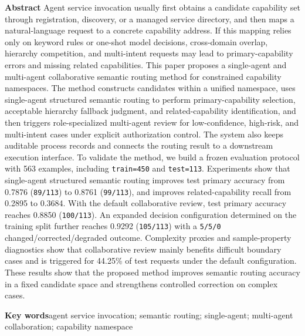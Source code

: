 \documentclass[10pt,a4paper,twocolumn,fontset=fandol]{ctexart}
\begin{document}
\noindent\textbf{Abstract}\quad
Agent service invocation usually first obtains a candidate capability set through registration, discovery, or a managed service directory, and then maps a natural-language request to a concrete capability address. If this mapping relies only on keyword rules or one-shot model decisions, cross-domain overlap, hierarchy competition, and multi-intent requests may lead to primary-capability errors and missing related capabilities. This paper proposes a single-agent and multi-agent collaborative semantic routing method for constrained capability namespaces. The method constructs candidates within a unified namespace, uses single-agent structured semantic routing to perform primary-capability selection, acceptable hierarchy fallback judgment, and related-capability identification, and then triggers role-specialized multi-agent review for low-confidence, high-risk, and multi-intent cases under explicit authorization control. The system also keeps auditable process records and connects the routing result to a downstream execution interface. To validate the method, we build a frozen evaluation protocol with 563 examples, including \texttt{train=450} and \texttt{test=113}. Experiments show that single-agent structured semantic routing improves test primary accuracy from 0.7876 (\texttt{89/113}) to 0.8761 (\texttt{99/113}), and improves related-capability recall from 0.2895 to 0.3684. With the default collaborative review, test primary accuracy reaches 0.8850 (\texttt{100/113}). An expanded decision configuration determined on the training split further reaches 0.9292 (\texttt{105/113}) with a \texttt{5/5/0} changed/corrected/degraded outcome. Complexity proxies and sample-property diagnostics show that collaborative review mainly benefits difficult boundary cases and is triggered for 44.25\% of test requests under the default configuration. These results show that the proposed method improves semantic routing accuracy in a fixed candidate space and strengthens controlled correction on complex cases.

\vspace{0.35em}
\noindent\textbf{Key words}\quad agent service invocation; semantic routing; single-agent; multi-agent collaboration; capability namespace
\end{document}
